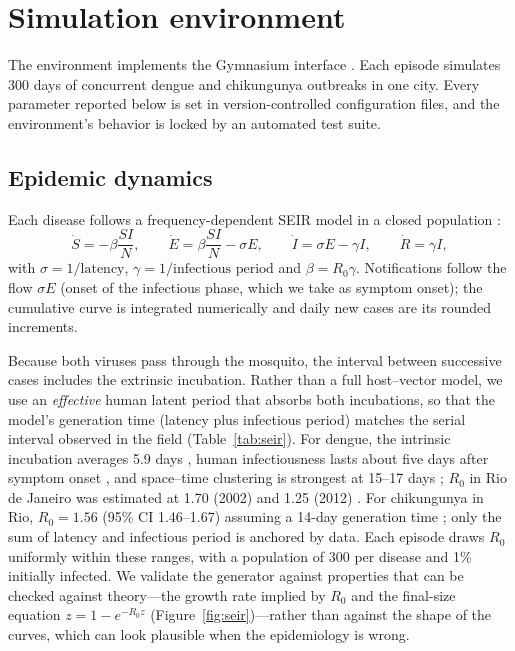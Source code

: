\documentclass[11pt,a4paper]{article}
\begin{document}
\section{Simulation environment}
\label{sec:env}

The environment implements the Gymnasium interface \cite{noauthor_gymnasium_nodate, towers_gymnasium_2023}. Each episode simulates 300 days of concurrent dengue and chikungunya outbreaks in one city. Every parameter reported below is set in version-controlled configuration files, and the environment's behavior is locked by an automated test suite.

\subsection{Epidemic dynamics}
\label{subsec:seir}

Each disease follows a frequency-dependent SEIR model in a closed population \cite{side2015sir, derouich_model_2003}:
\begin{equation}
    \dot S = -\beta \frac{S I}{N}, \qquad
    \dot E = \beta \frac{S I}{N} - \sigma E, \qquad
    \dot I = \sigma E - \gamma I, \qquad
    \dot R = \gamma I,
    \label{eq:seir}
\end{equation}
with $\sigma = 1/\text{latency}$, $\gamma = 1/\text{infectious period}$ and $\beta = R_0\gamma$. Notifications follow the flow $\sigma E$ (onset of the infectious phase, which we take as symptom onset); the cumulative curve is integrated numerically and daily new cases are its rounded increments.

Because both viruses pass through the mosquito, the interval between successive cases includes the extrinsic incubation. Rather than a full host--vector model, we use an \emph{effective} human latent period that absorbs both incubations, so that the model's generation time (latency plus infectious period) matches the serial interval observed in the field (Table~\ref{tab:seir}). For dengue, the intrinsic incubation averages 5.9 days \cite{chan2012incubation}, human infectiousness lasts about five days after symptom onset \cite{carrington2014human}, and space--time clustering is strongest at 15--17 days \cite{aldstadt2012spacetime}; $R_0$ in Rio de Janeiro was estimated at 1.70 (2002) and 1.25 (2012) \cite{villela2017zika}. For chikungunya in Rio, $R_0 = 1.56$ (95\% CI 1.46--1.67) assuming a 14-day generation time \cite{moreira2023chikungunya}; only the sum of latency and infectious period is anchored by data. Each episode draws $R_0$ uniformly within these ranges, with a population of 300 per disease and 1\% initially infected. We validate the generator against properties that can be checked against theory---the growth rate implied by $R_0$ and the final-size equation $z = 1 - e^{-R_0 z}$ (Figure~\ref{fig:seir})---rather than against the shape of the curves, which can look plausible when the epidemiology is wrong.
\end{document}
